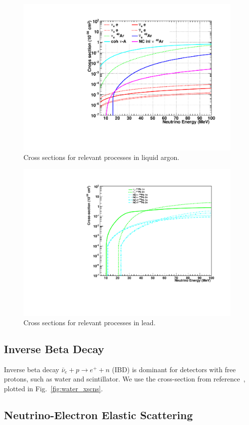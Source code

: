 \documentclass[12pt]{article}
\begin{document}
\begin{figure}[htb]
  \centering\includegraphics[width=.75\textwidth]{xscns_argon.pdf}
  \caption{Cross sections for relevant processes in liquid argon.}
  \label{fig:argon_xscns}
\end{figure}

\begin{figure}[htb]
  \centering\includegraphics[width=.75\textwidth]{xscns_lead.pdf}
  \caption{Cross sections for relevant processes in lead.}
  \label{fig:lead_xscns}
\end{figure}


\subsection{Inverse Beta Decay}

Inverse beta decay $\bar{\nu}_e+ p \rightarrow e^+ + n$ (IBD) is
dominant for detectors with free protons, such as water and
scintillator.  We use the cross-section from reference~\cite{strumia:2003zx},
plotted in Fig.~\ref{fig:water_xscns}.  


\subsection{Neutrino-Electron Elastic Scattering}
\end{document}
